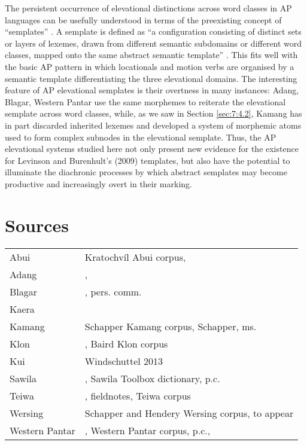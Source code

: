 \documentclass[output=paper]{LSP/langsci}
\begin{document}
The persistent occurrence of elevational distinctions across word classes in AP languages can be usefully understood in terms of the preexisting concept of ``semplates'' \citep{LevinsonEtAl2009}. A semplate is defined as ``a configuration consisting of distinct sets or layers of lexemes, drawn from different semantic subdomains or different word classes, mapped onto the same abstract semantic template''  \citep[154]{LevinsonEtAl2009}. This fits well with the basic AP pattern in which locationals and motion verbs are organised by a semantic template differentiating the three elevational domains. The interesting feature of AP elevational semplates is their overtness in many instances: Adang, Blagar, Western Pantar use the same morphemes to reiterate the elevational semplate across word classes, while, as we saw in Section \ref{sec:7:4.2}, Kamang has in part discarded inherited lexemes and developed a system of morphemic atoms used to form complex subnodes in the elevational semplate. Thus, the AP elevational systems studied here not only present new evidence for the existence for Levinson and Burenhult's (2009) templates, but also have the potential to illuminate the diachronic processes by which abstract semplates may become productive and increasingly overt in their marking. \nocite{LevinsonEtAl2009}


\section{Sources}



 
\begin{tabular}{lp{8cm}}
Abui  		&  Kratochv\'il Abui corpus, \citet{Kratochvil2007} \\			
Adang 		&  \citet{Haan2001}, \citet{RobinsonEtAlToAppear} 	\\		
Blagar  		&  \citet{Steinhauer1977,Steinhauer1991,Steinhauer2012}, pers. comm. 	\\
Kaera  		&  \citet{KlamerToAppear} 		\\				
Kamang  		&  Schapper Kamang corpus, Schapper, ms. 	\\				
Klon  		&  \citet{Baird2008}, Baird Klon corpus 	\\				
Kui  		&  Windschuttel 2013\\
Sawila 	 	&  \citet{KratochvilToAppear}, Sawila Toolbox dictionary, p.c.\\
Teiwa  		&  \citet{Klamer2010}, fieldnotes, Teiwa corpus\\
Wersing  	&  Schapper and Hendery Wersing corpus, to appear\\
Western Pantar  	&  \citet{Holton2007,Holton2011,HoltonToAppear}, Western Pantar corpus, p.c., \citet{HoltonEtAl2008}\\ 
\end{tabular}
\end{document}
